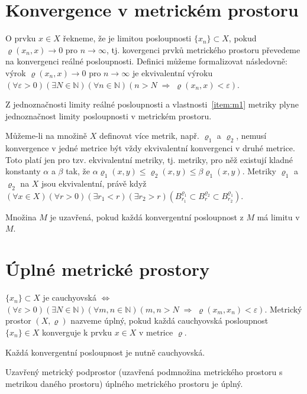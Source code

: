 \section{Konvergence v metrickém prostoru}

O prvku $x\in X$ řekneme, že je limitou posloupnosti $\{x_n\}\subset X$,
pokud $\varrho(x_n,x)\rightarrow 0$ pro $n\rightarrow\infty$,
tj. kovergenci prvků metrického prostoru převedeme na konvergenci reálné posloupnosti.
Definici můžeme formalizovat následovně:
výrok $\varrho(x_n,x)\rightarrow 0$ pro $n\rightarrow\infty$
je ekvivalentní výroku
$(\forall \varepsilon>0)(\exists N\in\mathbb{N})(\forall n\in\mathbb{N})
(n>N\;\Rightarrow\;\varrho(x_n,x)<\varepsilon)$.

Z jednoznačnosti limity reálné posloupnosti a vlastnosti~\ref{item:m1}
metriky plyne jednoznačnost limity posloupnosti v metrickém prostoru.

Můžeme-li na množině $X$ definovat více metrik, např. $\varrho_1$ a $\varrho_2$,
nemusí konvergence v jedné metrice být vždy ekvivalentní konvergenci v druhé metrice.
Toto platí jen pro tzv. ekvivalentní metriky, tj. metriky, pro něž existují
kladné konstanty $\alpha$ a $\beta$ tak, že 
$\alpha\varrho_1(x,y)\leq\varrho_2(x,y)\leq\beta\varrho_1(x,y)$.
Metriky $\varrho_1$ a $\varrho_2$ na $X$ jsou ekvivalentní, právě když
$(\forall x\in X)(\forall r>0)(\exists r_1<r)(\exists r_2>r)
 (B_{r_1}^{\varrho_1}\subset B_r^{\varrho_2}\subset B_{r_2}^{\varrho_1})$.

Množina $M$ je uzavřená, pokud každá konvergentní posloupnost z $M$
má limitu v $M$.

\section{Úplné metrické prostory}

$\{x_n\}\subset X$ je cauchyovská $\Leftrightarrow$
$(\forall\varepsilon>0)(\exists N\in\mathbb{N})(\forall m,n\in\mathbb{N})
(m,n>N\;\Rightarrow\;\varrho(x_m,x_n)<\varepsilon)$.
Metrický prostor $(X,\varrho)$ nazveme úplný, pokud každá cauchyovská posloupnost
$\{x_n\}\in X$ konverguje k prvku $x\in X$ v metrice $\varrho$.

Každá konvergentní posloupnost je nutně cauchyovská.

Uzavřený metrický podprostor (uzavřená podmnožina metrického prostoru
s metrikou daného prostoru) úplného metrického prostoru je úplný.

